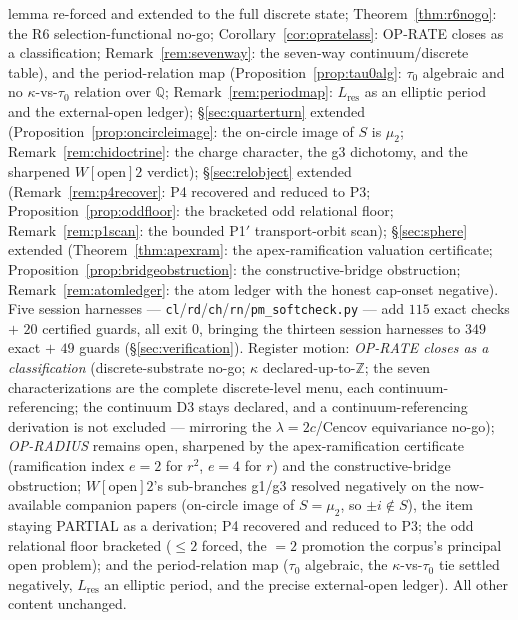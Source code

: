 \documentclass[11pt]{article}
\newcommand{\Q}{\mathbb{Q}}
\newcommand{\Z}{\mathbb{Z}}
\theoremstyle{plain}
\theoremstyle{definition}
\theoremstyle{remark}
\begin{document}
lemma re-forced and extended to the full discrete state;
Theorem~\ref{thm:r6nogo}: the R6 selection-functional no-go;
Corollary~\ref{cor:opratelass}: OP-RATE closes as a classification;
Remark~\ref{rem:sevenway}: the seven-way continuum/discrete table), and the
period-relation map (Proposition~\ref{prop:tau0alg}: $\tau_0$ algebraic and
no $\kappa$-vs-$\tau_0$ relation over $\Q$; Remark~\ref{rem:periodmap}:
$L_{\mathrm{res}}$ as an elliptic period and the external-open ledger);
\S\ref{sec:quarterturn} extended (Proposition~\ref{prop:oncircleimage}: the
on-circle image of $S$ is $\mu_2$; Remark~\ref{rem:chidoctrine}: the charge
character, the g3 dichotomy, and the sharpened $W[\text{open}]2$ verdict);
\S\ref{sec:relobject} extended (Remark~\ref{rem:p4recover}: P4 recovered and
reduced to P3; Proposition~\ref{prop:oddfloor}: the bracketed odd relational
floor; Remark~\ref{rem:p1scan}: the bounded P1$'$ transport-orbit scan);
\S\ref{sec:sphere} extended (Theorem~\ref{thm:apexram}: the apex-ramification
valuation certificate; Proposition~\ref{prop:bridgeobstruction}: the
constructive-bridge obstruction; Remark~\ref{rem:atomledger}: the atom
ledger with the honest cap-onset negative). Five session harnesses ---
\texttt{cl}/\texttt{rd}/\texttt{ch}/\texttt{rn}/\texttt{pm\_softcheck.py}
--- add $115$ exact checks $+$ $20$ certified guards, all exit 0, bringing
the thirteen session harnesses to $349$ exact $+$ $49$ guards
(\S\ref{sec:verification}). Register motion: \emph{OP-RATE closes as a
classification} (discrete-substrate no-go; $\kappa$ declared-up-to-$\Z$; the
seven characterizations are the complete discrete-level menu, each
continuum-referencing; the continuum D3 stays declared, and a
continuum-referencing derivation is not excluded --- mirroring the
$\lambda=2c$/Cencov equivariance no-go); \emph{OP-RADIUS} remains open,
sharpened by the apex-ramification certificate (ramification index
$e=2$ for $r^2$, $e=4$ for $r$) and the constructive-bridge obstruction;
$W[\text{open}]2$'s sub-branches g1/g3 resolved negatively on the
now-available companion papers (on-circle image of $S=\mu_2$, so $\pm
i\notin S$), the item staying PARTIAL as a derivation; P4 recovered and
reduced to P3; the odd relational floor bracketed ($\le2$ forced, the $=2$
promotion the corpus's principal open problem); and the period-relation map
($\tau_0$ algebraic, the $\kappa$-vs-$\tau_0$ tie settled negatively,
$L_{\mathrm{res}}$ an elliptic period, and the precise external-open ledger).
All other content unchanged.
\end{document}

